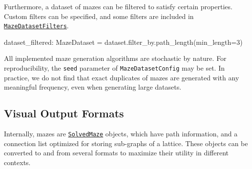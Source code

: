 \documentclass[10pt,a4paper,onecolumn]{article}
\newenvironment{Shaded}{}{}
\newcommand{\DecValTok}[1]{\textcolor[rgb]{0.25,0.63,0.44}{#1}}
\newcommand{\NormalTok}[1]{#1}
\newcommand{\OperatorTok}[1]{\textcolor[rgb]{0.40,0.40,0.40}{#1}}
\begin{document}
Furthermore, a dataset of mazes can be filtered to satisfy certain
properties. Custom filters can be specified, and some filters are
included in
\href{https://understanding-search.github.io/maze-dataset/maze_dataset/dataset/filters.html\#MazeDatasetFilters}{\texttt{MazeDatasetFilters}}.

\begin{Shaded}
\begin{Highlighting}[]
\NormalTok{dataset\_filtered: MazeDataset }\OperatorTok{=}\NormalTok{ dataset.filter\_by.path\_length(min\_length}\OperatorTok{=}\DecValTok{3}\NormalTok{)}
\end{Highlighting}
\end{Shaded}

All implemented maze generation algorithms are stochastic by nature. For
reproducibility, the \texttt{seed} parameter of
\texttt{MazeDatasetConfig} may be set. In practice, we do not find that
exact duplicates of mazes are generated with any meaningful frequency,
even when generating large datasets.

\hypertarget{visual-output-formats}{%
\subsection{Visual Output Formats}\label{visual-output-formats}}

Internally, mazes are
\href{https://understanding-search.github.io/maze-dataset/maze_dataset.html\#SolvedMaze}{\texttt{SolvedMaze}}
objects, which have path information, and a connection list optimized
for storing sub-graphs of a lattice. These objects can be converted to
and from several formats to maximize their utility in different
contexts.
\end{document}
